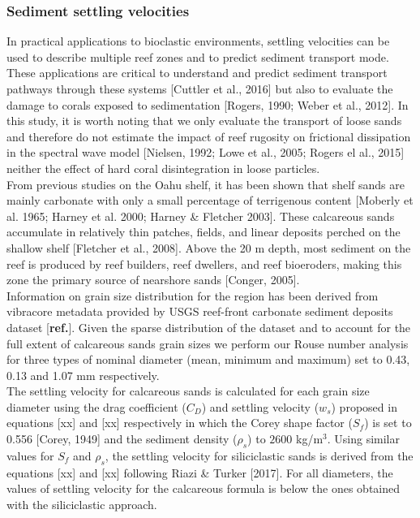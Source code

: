 \documentclass[9pt,twocolumn,twoside]{pnas-new}
\begin{document}
\subsubsection*{Sediment settling velocities}

In practical applications to bioclastic environments, settling velocities can be used to describe multiple reef zones and to predict sediment transport mode. These applications are critical to understand and predict sediment transport pathways through these systems [Cuttler et al., 2016] but also to evaluate the damage to corals exposed to sedimentation [Rogers, 1990; Weber et al., 2012]. In this study, it is worth noting that we only evaluate the transport of loose sands and therefore do not estimate the impact of reef rugosity on frictional dissipation in the spectral wave model  [Nielsen, 1992; Lowe et al., 2005; Rogers el al., 2015] neither the effect of hard coral disintegration in loose particles.\\
From previous studies on the Oahu shelf, it has been shown that shelf sands are mainly carbonate with only a small percentage of terrigenous content [Moberly et al. 1965; Harney et al. 2000; Harney \& Fletcher 2003]. These calcareous sands accumulate in relatively thin patches, fields, and linear deposits perched on the shallow shelf [Fletcher et al., 2008].  Above the 20 m depth, most sediment on the reef is produced by reef builders, reef dwellers, and reef bioeroders, making this zone the primary source of nearshore sands [Conger, 2005].\\
Information on grain size distribution for the region has been derived from vibracore metadata provided by USGS reef-front carbonate sediment deposits dataset [\textbf{ref.}]. Given the sparse distribution of the dataset and to account for the full extent of calcareous sands grain sizes we perform our Rouse number analysis for three types of nominal diameter (mean, minimum and maximum) set to 0.43, 0.13 and 1.07 mm respectively. \\
The settling velocity for calcareous sands is calculated for each grain size diameter using the drag coefficient ($C_D$) and settling velocity ($w_s$) proposed in equations [xx] and [xx] respectively in which the Corey shape factor ($S_f$) is set to 0.556 [Corey, 1949] and the sediment density ($\rho_s$) to $2600$ kg/m$^3$. Using similar values for $S_f$ and $\rho_s$, the settling velocity for siliciclastic sands is derived from the equations [xx] and [xx] following Riazi \& Turker [2017]. For all diameters, the values of settling velocity for the calcareous formula is below the ones obtained with the siliciclastic approach. 
\end{document}
